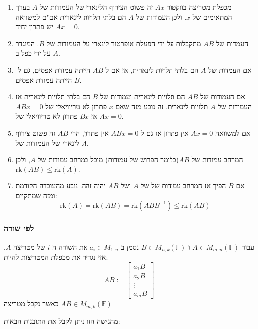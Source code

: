 \documentclass{tstextbook}
\begin{document}
\begin{enumerate}
  \item מכפלת מטריצה בווקטור \(Ax\) זה פשוט הצירוף הלינארי של העמודות של \(A\) בערך המתאימים של \(x\). ולכן העמודות של \(A\) הם בלתי תלויות לינארית אם"ם למשוואה \(Ax=0\) יש פתרון יחיד. 


  \item העמדות של \(AB\) מתקבלות על ידי הפעלת אופרטור לינארי על העמודות של \(B\). המוגדר על ידי כפל ב-\(A\). 


  \item אם העמדות של \(A\) הם בלתי תלויות לינארית, אז אם ל-\(AB\) הייתה עמודת אפסים, גם ל-\(B\) הייתה עמודת אפסים. 


  \item אם העמודות של \(AB\) הם תלויות לינארית ועמודות של \(B\) הם בלתי תלויות לינארית אז העמודות של \(A\) תלויות לינארית. זה נובע מזה שאם \(x\) פתרון לא טריוויאלי של \(ABx=0\) אז \(Bx\) פתרון לא טריוויאלי של \(Ax=0\). 


  \item אם למשוואה \(Ax=0\) אין פתרון אז גם ל-\(ABx=0\) אין פתרון, הרי \(AB\) זה פשוט צירוף לינארי של העמודות של \(A\). 


  \item המרחב עמודות של \(AB\)(כלומר הפרוש של עמודות) מוכל במרחב עמודות של \(A\), ולכן \(\mathrm{rk}(AB)\leq \mathrm{rk}(A)\). 


  \item אם \(B\) הפיך אז המרחב עמודות של של \(A\) ושל \(AB\) יהיה זהה. נובע מהעובדה הקודמת ומזה שמתקיים: 
$$\mathrm{rk}(A)=\mathrm{rk}(AB)=\mathrm{rk}(ABB^{-1})\leq\mathrm{rk}(AB)$$


\end{enumerate}
\subsubsection{לפי שורה}

\begin{definition}
עבור \(A \in M_{m,n}\left( \mathbb{F}  \right)\) ו-\(B \in M_{n,k}\left( \mathbb{F}  \right)\) נסמן ב-\(a_{i}\in M_{1,n}\) את השורה ה-\(i\) של מטריצה \(A\). אזי נגדיר את מכפלת המטריצות להיות:
$$A B:=\begin{bmatrix}a_{1}B\\ a_{2} B\\ \vdots \\a_{m}B
\end{bmatrix}$$
כאשר נקבל מטריצה \(AB \in M_{m,k}\left( \mathbb{F}  \right)\)

\end{definition}
מהגישה הזו ניתן לקבל את התובנות הבאות:
\end{document}
